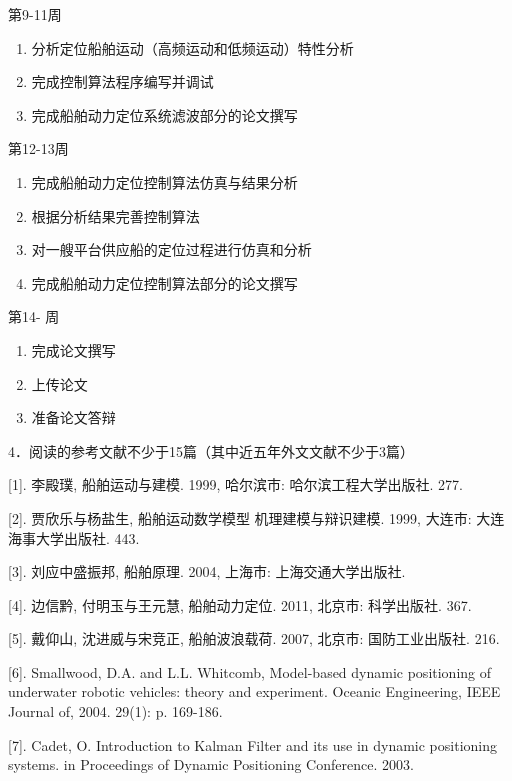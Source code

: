 \documentclass[a4paper]{ctexart}
\begin{document}
\begin{mdframed}
{\large \fangsong 

第9-11周
\begin{enumerate}
\item 分析定位船舶运动（高频运动和低频运动）特性分析
\item 完成控制算法程序编写并调试
\item 完成船舶动力定位系统滤波部分的论文撰写
\end{enumerate}


第12-13周
\begin{enumerate}
\item 完成船舶动力定位控制算法仿真与结果分析
\item 根据分析结果完善控制算法
\item 对一艘平台供应船的定位过程进行仿真和分析
\item 完成船舶动力定位控制算法部分的论文撰写
\end{enumerate}


第14- 周
\begin{enumerate}
\item 完成论文撰写
\item 上传论文
\item 准备论文答辩
 
\end{enumerate}


\begin{flushleft}
4．阅读的参考文献不少于15篇（其中近五年外文文献不少于3篇）
\end{flushleft}

[1].	李殿璞, 船舶运动与建模. 1999, 哈尔滨市: 哈尔滨工程大学出版社. 277.

 [2].	贾欣乐与杨盐生, 船舶运动数学模型  机理建模与辩识建模. 1999, 大连市: 大连海事大学出版社. 443.
 
 [3].	刘应中盛振邦, 船舶原理. 2004, 上海市: 上海交通大学出版社.
 
 [4].	边信黔, 付明玉与王元慧, 船舶动力定位. 2011, 北京市: 科学出版社. 367.
 
 [5].	戴仰山, 沈进威与宋竞正, 船舶波浪载荷. 2007, 北京市: 国防工业出版社. 216.
 
 [6].	Smallwood, D.A. and L.L. Whitcomb, Model-based dynamic positioning of underwater robotic vehicles: theory and experiment. Oceanic Engineering, IEEE Journal of, 2004. 29(1): p. 169-186.
 
 [7].	Cadet, O. Introduction to Kalman Filter and its use in dynamic positioning systems. in Proceedings of Dynamic Positioning Conference. 2003.
 }
 \end{mdframed}
 
\end{document}
